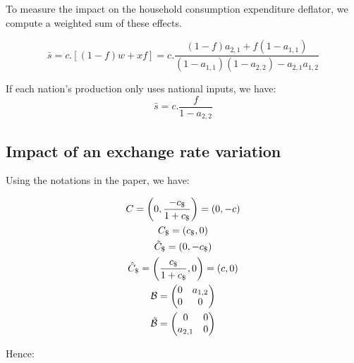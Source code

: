 \documentclass[12pt,a4paper]{article}
\begin{document}
To measure the impact on the household consumption expenditure deflator, we compute a weighted sum of these effects.

\begin{equation}
\bar{s}=c.\left[\left(1-f\right)w+xf\right]=c.\frac{\left(1-f\right)a_{2,1}+f\left(1-a_{1,1}\right)}{\left(1-a_{1,1}\right)\left(1-a_{2,2}\right)-a_{2,1}a_{1,2}}
\end{equation}

If each nation's production only uses national inputs, we have:
\begin{equation*}
\bar{s}=c.\frac{f}{1-a_{2,2}}
\end{equation*}

\subsection*{Impact of an exchange rate variation}

Using the notations in the paper, we have:

\begin{gather*}
C=\left(0,\frac{-c_\$}{1+c_\$}\right)=\left(0,-c\right)
\\
C_\$=\left(c_\$,0\right)
\\
\tilde{C}_\$=\left(0,-c_\$\right)
\\
\hat{C}_\$=\left(\frac{c_\$}{1+c_\$},0\right)=\left(c,0\right)
\\
{\cal B} = \left(\begin{matrix}0&a_{1,2}\\0&0\end{matrix}\right)
\\
\tilde{\cal B} = \left(\begin{matrix}0&0\\a_{2,1}&0\end{matrix}\right)
\end{gather*}

Hence:
\end{document}
